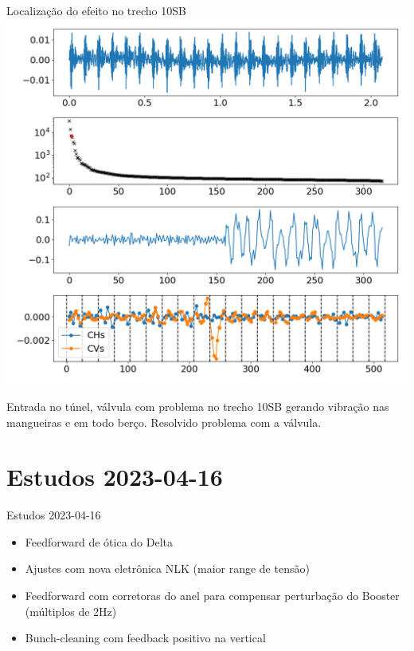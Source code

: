 \documentclass[1611]{beamer}            %
\begin{document}
\begin{frame}{Localização do efeito no trecho 10SB}
\centering
    \includegraphics[scale=0.25]{2024-05-10/figures/bpm_data_rate_fofb_sofbstate_off_fofbstate_off_gain_0p052_rfline_off_llrf_ki_8000_kp_155.png}

Entrada no túnel, válvula com problema no trecho 10SB gerando vibração nas mangueiras e em todo berço. Resolvido problema com a válvula.
\end{frame}


\section{Estudos 2023-04-16}

\begin{frame}{Estudos 2023-04-16}
    \begin{itemize}
        \item Feedforward de ótica do Delta
        \item Ajustes com nova eletrônica NLK (maior range de tensão)
        \item Feedforward com corretoras do anel para compensar perturbação do Booster (múltiplos de 2Hz)
        \item Bunch-cleaning com feedback positivo na vertical
    \end{itemize}
\end{frame}
\end{document}
